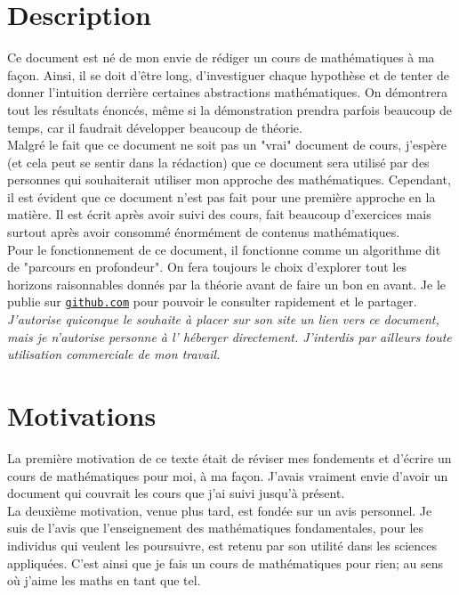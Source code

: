 \section*{Description}
Ce document est né de mon envie de rédiger un cours de mathématiques à ma façon. Ainsi, il se doit d'être long, d'investiguer chaque hypothèse et de tenter de donner l'intuition derrière certaines abstractions mathématiques. On démontrera tout les résultats énoncés, même si la démonstration prendra parfois beaucoup de temps, car il faudrait développer beaucoup de théorie. \\

Malgré le fait que ce document ne soit pas un "vrai" document de cours, j'espère (et cela peut se sentir dans la rédaction) que ce document sera utilisé par des personnes qui souhaiterait utiliser mon approche des mathématiques. Cependant, il est évident que ce document n'est pas fait pour une première approche en la matière. Il est écrit après avoir suivi des cours, fait beaucoup d'exercices mais surtout après avoir consommé énormément de contenus mathématiques. \\

Pour le fonctionnement de ce document, il fonctionne comme un algorithme dit de "parcours en profondeur". On fera toujours le choix d'explorer tout les horizons raisonnables donnés par la théorie avant de faire un bon en avant. Je le publie sur \href{https://github.com/pierremechelinck/maths}{\texttt{github.com}} pour pouvoir le consulter rapidement et le partager. \\


\emph{J’autorise quiconque le souhaite à placer sur son site un lien vers ce document, mais je n’autorise personne à l' héberger directement. J’interdis par ailleurs toute utilisation commerciale de mon travail.}

\section*{Motivations}
La première motivation de ce texte était de réviser mes fondements et d'écrire un cours de mathématiques pour moi, à ma façon. J'avais vraiment envie d'avoir un document qui couvrait les cours que j'ai suivi jusqu'à présent. \\

La deuxième motivation, venue plus tard, est fondée sur un avis personnel. Je suis de l'avis que l'enseignement des mathématiques fondamentales, pour les individus qui veulent les poursuivre, est retenu par son utilité dans les sciences appliquées. C'est ainsi que je fais un cours de mathématiques pour rien; au sens où j'aime les maths en tant que tel.


